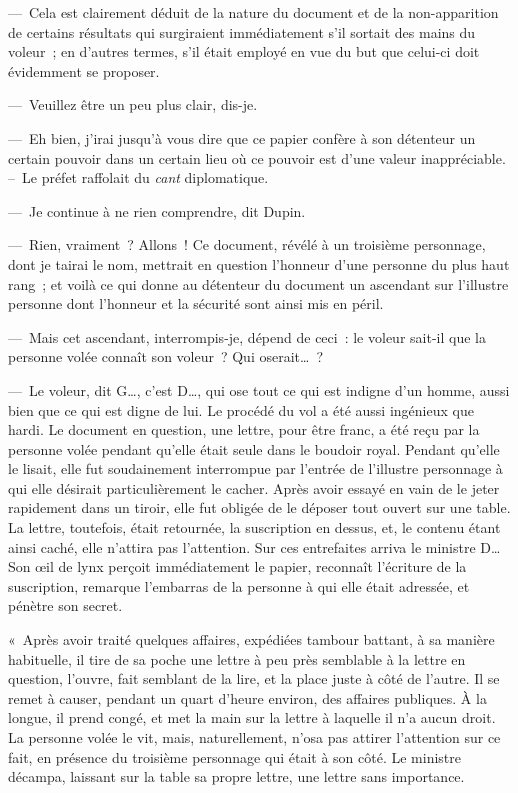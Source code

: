 \documentclass[french,twoside]{book} %
\begin{document}
— Cela est clairement déduit de la nature du document et de la non-apparition de certains résultats qui surgiraient immédiatement s’il sortait des mains du voleur ; en d’autres termes, s’il était employé en vue du but que celui-ci doit évidemment se proposer.\par
— Veuillez être un peu plus clair, dis-je.\par
— Eh bien, j’irai jusqu’à vous dire que ce papier confère à son détenteur un certain pouvoir dans un certain lieu où ce pouvoir est d’une valeur inappréciable. – Le préfet raffolait du \emph{cant} diplomatique.\par
— Je continue à ne rien comprendre, dit Dupin.\par
— Rien, vraiment ? Allons ! Ce document, révélé à un troisième personnage, dont je tairai le nom, mettrait en question l’honneur d’une personne du plus haut rang ; et voilà ce qui donne au détenteur du document un ascendant sur l’illustre personne dont l’honneur et la sécurité sont ainsi mis en péril.\par
— Mais cet ascendant, interrompis-je, dépend de ceci : le voleur sait-il que la personne volée connaît son voleur ? Qui oserait… ?\par
— Le voleur, dit G…, c’est D…, qui ose tout ce qui est indigne d’un homme, aussi bien que ce qui est digne de lui. Le procédé du vol a été aussi ingénieux que hardi. Le document en question, une lettre, pour être franc, a été reçu par la personne volée pendant qu’elle était seule dans le boudoir royal. Pendant qu’elle le lisait, elle fut soudainement interrompue par l’entrée de l’illustre personnage à qui elle désirait particulièrement le cacher. Après avoir essayé en vain de le jeter rapidement dans un tiroir, elle fut obligée de le déposer tout ouvert sur une table. La lettre, toutefois, était retournée, la suscription en dessus, et, le contenu étant ainsi caché, elle n’attira pas l’attention. Sur ces entrefaites arriva le ministre D… Son œil de lynx perçoit immédiatement le papier, reconnaît l’écriture de la suscription, remarque l’embarras de la personne à qui elle était adressée, et pénètre son secret.\par
« Après avoir traité quelques affaires, expédiées tambour battant, à sa manière habituelle, il tire de sa poche une lettre à peu près semblable à la lettre en question, l’ouvre, fait semblant de la lire, et la place juste à côté de l’autre. Il se remet à causer, pendant un quart d’heure environ, des affaires publiques. À la longue, il prend congé, et met la main sur la lettre à laquelle il n’a aucun droit. La personne volée le vit, mais, naturellement, n’osa pas attirer l’attention sur ce fait, en présence du troisième personnage qui était à son côté. Le ministre décampa, laissant sur la table sa propre lettre, une lettre sans importance.\par
\end{document}
